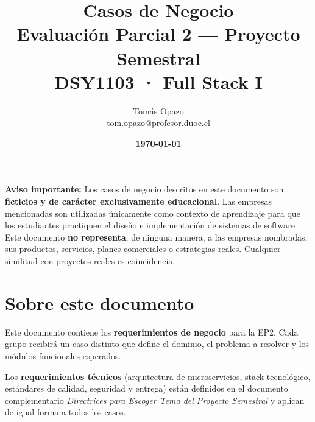\documentclass[12pt]{article}
\begin{document}
\title{
    \vspace{-1cm}
    \textbf{Casos de Negocio} \\[0.4em]
    \large Evaluación Parcial 2 --- Proyecto Semestral \\[0.2em]
    \normalsize DSY1103 · Full Stack I
}
\author{Tomás Opazo \\ tom.opazo@profesor.duoc.cl}
\date{\textbf{\today}}
\maketitle
\thispagestyle{fancy}

\begin{warningbox}
\textbf{Aviso importante:} Los casos de negocio descritos en este documento son
\textbf{ficticios y de carácter exclusivamente educacional}. Las empresas
mencionadas son utilizadas únicamente como contexto de aprendizaje para que
los estudiantes practiquen el diseño e implementación de sistemas de software.
Este documento \textbf{no representa}, de ninguna manera, a las empresas
nombradas, sus productos, servicios, planes comerciales o estrategias reales.
Cualquier similitud con proyectos reales es coincidencia.
\end{warningbox}

\vspace{0.5em}

\section*{Sobre este documento}

Este documento contiene los \textbf{requerimientos de negocio} para la EP2.
Cada grupo recibirá un caso distinto que define el dominio, el problema a
resolver y los módulos funcionales esperados.

Los \textbf{requerimientos técnicos} (arquitectura de microservicios, stack
tecnológico, estándares de calidad, seguridad y entrega) están definidos en
el documento complementario \textit{Directrices para Escoger Tema del Proyecto
Semestral} y aplican de igual forma a todos los casos.
\end{document}

